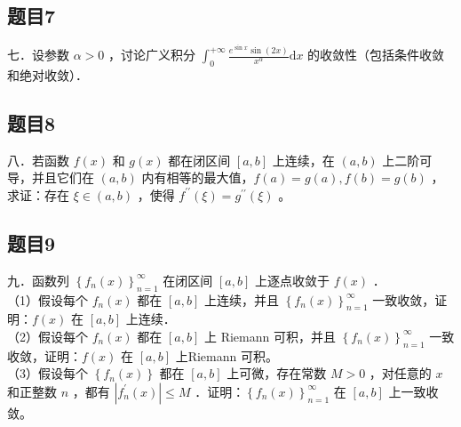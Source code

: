 \documentclass{article}
\begin{document}
\subsection{题目7}
七．设参数 \(\alpha>0\) ，讨论广义积分 \(\int_{0}^{+\infty} \frac{e^{\sin x} \sin (2 x)}{x^{\alpha}} \mathrm{d} x\) 的收敛性（包括条件收敛和绝对收敛）．

\subsection{题目8}
八．若函数 \(f(x)\) 和 \(g(x)\) 都在闭区间 \([a, b]\) 上连续，在 \((a, b)\) 上二阶可导，并且它们在 \((a, b)\) 内有相等的最大值，\(f(a)=g(a), f(b)=g(b)\) ，求证：存在 \(\xi \in(a, b)\) ，使得 \(f^{\prime \prime}(\xi)=g^{\prime \prime}(\xi)\) 。

\subsection{题目9}
九．函数列 \(\left\{f_{n}(x)\right\}_{n=1}^{\infty}\) 在闭区间 \([a, b]\) 上逐点收敛于 \(f(x)\) ．\\
（1）假设每个 \(f_{n}(x)\) 都在 \([a, b]\) 上连续，并且 \(\left\{f_{n}(x)\right\}_{n=1}^{\infty}\) 一致收敛，证明：\(f(x)\) 在 \([a, b]\) 上连续．\\
（2）假设每个 \(f_{n}(x)\) 都在 \([a, b]\) 上 Riemann 可积，并且 \(\left\{f_{n}(x)\right\}_{n=1}^{\infty}\) 一致收敛，证明：\(f(x)\) 在 \([a, b]\) 上Riemann 可积。\\
（3）假设每个 \(\left\{f_{n}(x)\right\}\) 都在 \([a, b]\) 上可微，存在常数 \(M>0\) ，对任意的 \(x\) 和正整数 \(n\) ，都有 \(\left|f_{n}^{\prime}(x)\right| \leq M\) ．证明：\(\left\{f_{n}(x)\right\}_{n=1}^{\infty}\) 在 \([a, b]\) 上一致收敛。
\end{document}
